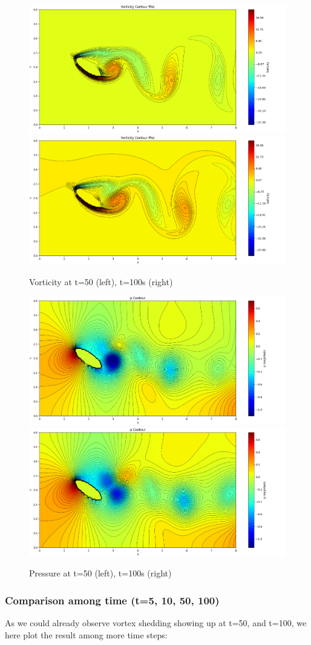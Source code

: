\documentclass[12pt]{article}
\begin{document}
\begin{figure}[H]
    \centering
    \includegraphics[width=0.45\linewidth]{figure/Ellip_N32_Re300_8x4_t50/vor_Ellip_N32_Re300_8x4_t50.jpg}
    \includegraphics[width=0.45\linewidth]{figure/Ellip_N32_Re300_8x4_t100/vor_Ellip_N32_Re300_8x4_t100.jpg}
    \caption{Vorticity at t=50 (left), t=100s (right)}
\end{figure}



\begin{figure}[H]
    \centering
    \includegraphics[width=0.45\linewidth]{figure/Ellip_N32_Re300_8x4_t50/p_Ellip_N32_Re300_8x4_t50.jpg}
    \includegraphics[width=0.45\linewidth]{figure/Ellip_N32_Re300_8x4_t100/p_Ellip_N32_Re300_8x4_t100.jpg}
    \caption{Pressure at t=50 (left), t=100s (right)}
\end{figure}







\subsubsection{Comparison among time (t=5, 10, 50, 100)}
As we could already observe vortex shedding showing up at t=50, and t=100, we here plot the result among more time steps:
\end{document}
